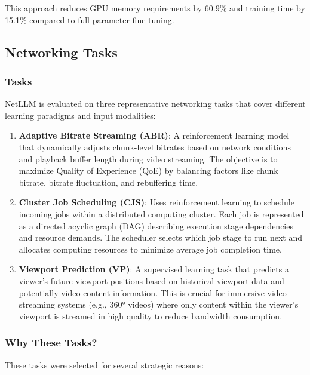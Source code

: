 \documentclass[twocolumn]{article}
\begin{document}
This approach reduces GPU memory requirements by 60.9\% and training time by 15.1\% compared to full parameter fine-tuning.

\subsection{Networking Tasks}

\subsubsection{Tasks}
NetLLM is evaluated on three representative networking tasks that cover different learning paradigms and input modalities:

\begin{enumerate}[itemsep=0pt, topsep=2pt, parsep=0pt]
  \item \textbf{Adaptive Bitrate Streaming (ABR)}: A reinforcement learning model that dynamically adjusts chunk-level bitrates based on network conditions and playback buffer length during video streaming. The objective is to maximize Quality of Experience (QoE) by balancing factors like chunk bitrate, bitrate fluctuation, and rebuffering time.

  \item \textbf{Cluster Job Scheduling (CJS)}: Uses reinforcement learning to schedule incoming jobs within a distributed computing cluster. Each job is represented as a directed acyclic graph (DAG) describing execution stage dependencies and resource demands. The scheduler selects which job stage to run next and allocates computing resources to minimize average job completion time.

  \item \textbf{Viewport Prediction (VP)}: A supervised learning task that predicts a viewer's future viewport positions based on historical viewport data and potentially video content information. This is crucial for immersive video streaming systems (e.g., 360° videos) where only content within the viewer's viewport is streamed in high quality to reduce bandwidth consumption.
\end{enumerate}

\subsubsection{Why These Tasks?}
These tasks were selected for several strategic reasons:
\end{document}
